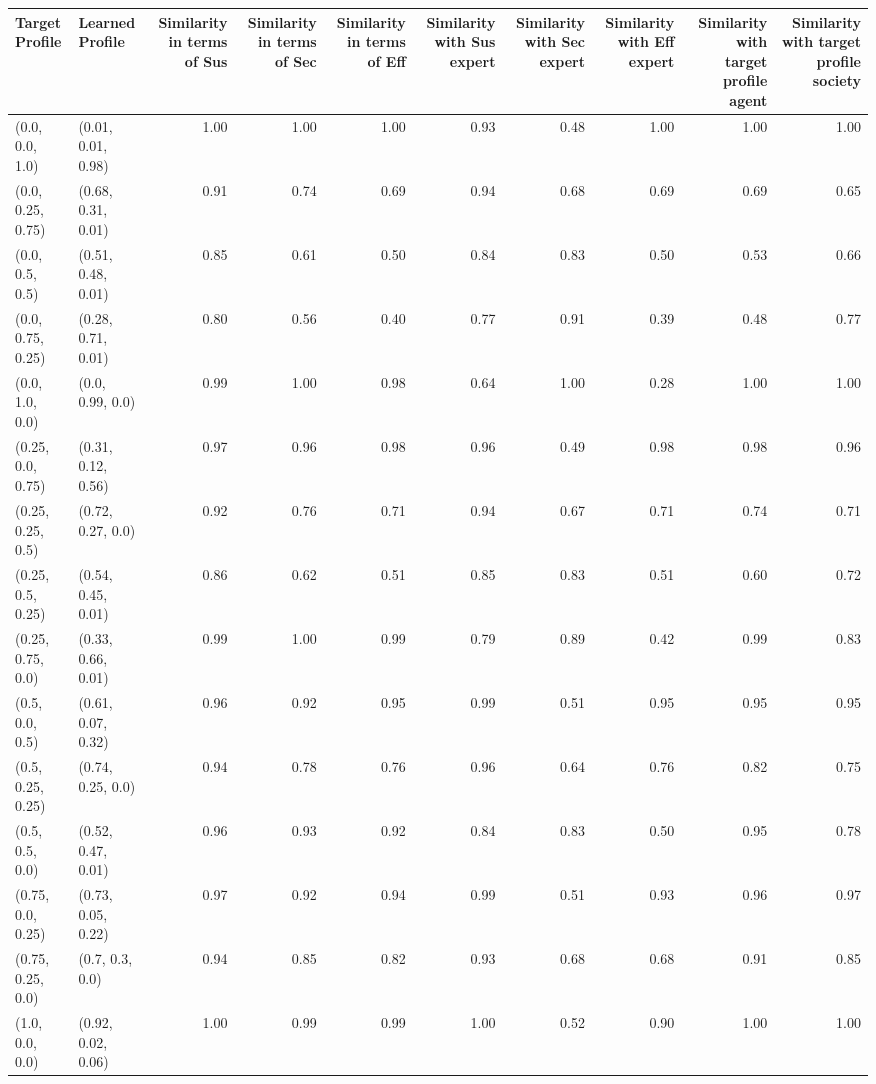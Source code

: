 \begin{tabular}{llrrrrrrrr}
\toprule
Target Profile & Learned Profile & Similarity in terms of Sus & Similarity in terms of Sec & Similarity in terms of Eff & Similarity with Sus expert & Similarity with Sec expert & Similarity with Eff expert & Similarity with target profile agent & Similarity with target profile society \\
\midrule
(0.0, 0.0, 1.0) & (0.01, 0.01, 0.98) & 1.00 & 1.00 & 1.00 & 0.93 & 0.48 & 1.00 & 1.00 & 1.00 \\
(0.0, 0.25, 0.75) & (0.68, 0.31, 0.01) & 0.91 & 0.74 & 0.69 & 0.94 & 0.68 & 0.69 & 0.69 & 0.65 \\
(0.0, 0.5, 0.5) & (0.51, 0.48, 0.01) & 0.85 & 0.61 & 0.50 & 0.84 & 0.83 & 0.50 & 0.53 & 0.66 \\
(0.0, 0.75, 0.25) & (0.28, 0.71, 0.01) & 0.80 & 0.56 & 0.40 & 0.77 & 0.91 & 0.39 & 0.48 & 0.77 \\
(0.0, 1.0, 0.0) & (0.0, 0.99, 0.0) & 0.99 & 1.00 & 0.98 & 0.64 & 1.00 & 0.28 & 1.00 & 1.00 \\
(0.25, 0.0, 0.75) & (0.31, 0.12, 0.56) & 0.97 & 0.96 & 0.98 & 0.96 & 0.49 & 0.98 & 0.98 & 0.96 \\
(0.25, 0.25, 0.5) & (0.72, 0.27, 0.0) & 0.92 & 0.76 & 0.71 & 0.94 & 0.67 & 0.71 & 0.74 & 0.71 \\
(0.25, 0.5, 0.25) & (0.54, 0.45, 0.01) & 0.86 & 0.62 & 0.51 & 0.85 & 0.83 & 0.51 & 0.60 & 0.72 \\
(0.25, 0.75, 0.0) & (0.33, 0.66, 0.01) & 0.99 & 1.00 & 0.99 & 0.79 & 0.89 & 0.42 & 0.99 & 0.83 \\
(0.5, 0.0, 0.5) & (0.61, 0.07, 0.32) & 0.96 & 0.92 & 0.95 & 0.99 & 0.51 & 0.95 & 0.95 & 0.95 \\
(0.5, 0.25, 0.25) & (0.74, 0.25, 0.0) & 0.94 & 0.78 & 0.76 & 0.96 & 0.64 & 0.76 & 0.82 & 0.75 \\
(0.5, 0.5, 0.0) & (0.52, 0.47, 0.01) & 0.96 & 0.93 & 0.92 & 0.84 & 0.83 & 0.50 & 0.95 & 0.78 \\
(0.75, 0.0, 0.25) & (0.73, 0.05, 0.22) & 0.97 & 0.92 & 0.94 & 0.99 & 0.51 & 0.93 & 0.96 & 0.97 \\
(0.75, 0.25, 0.0) & (0.7, 0.3, 0.0) & 0.94 & 0.85 & 0.82 & 0.93 & 0.68 & 0.68 & 0.91 & 0.85 \\
(1.0, 0.0, 0.0) & (0.92, 0.02, 0.06) & 1.00 & 0.99 & 0.99 & 1.00 & 0.52 & 0.90 & 1.00 & 1.00 \\
\bottomrule
\end{tabular}
